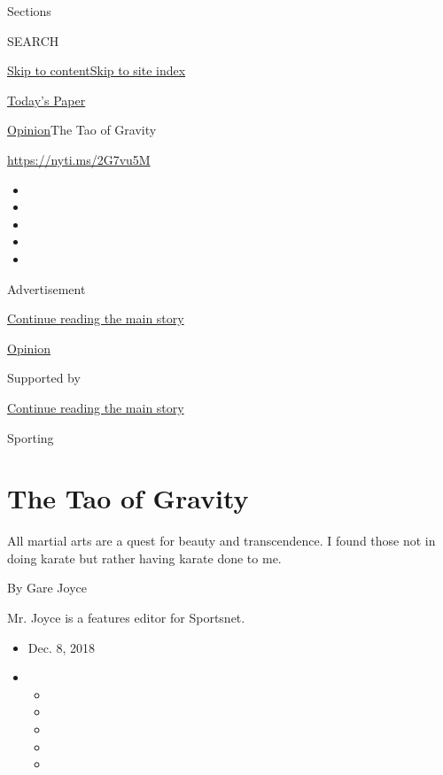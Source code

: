 Sections

SEARCH

\protect\hyperlink{site-content}{Skip to
content}\protect\hyperlink{site-index}{Skip to site index}

\href{https://myaccount.nytimes3xbfgragh.onion/auth/login?response_type=cookie\&client_id=vi}{}

\href{https://www.nytimes3xbfgragh.onion/section/todayspaper}{Today's
Paper}

\href{/section/opinion}{Opinion}\textbar{}The Tao of Gravity

\url{https://nyti.ms/2G7vu5M}

\begin{itemize}
\item
\item
\item
\item
\item
\end{itemize}

Advertisement

\protect\hyperlink{after-top}{Continue reading the main story}

\href{/section/opinion}{Opinion}

Supported by

\protect\hyperlink{after-sponsor}{Continue reading the main story}

Sporting

\hypertarget{the-tao-of-gravity}{%
\section{The Tao of Gravity}\label{the-tao-of-gravity}}

All martial arts are a quest for beauty and transcendence. I found those
not in doing karate but rather having karate done to me.

By Gare Joyce

Mr. Joyce is a features editor for Sportsnet.

\begin{itemize}
\item
  Dec. 8, 2018
\item
  \begin{itemize}
  \item
  \item
  \item
  \item
  \item
  \end{itemize}
\end{itemize}

